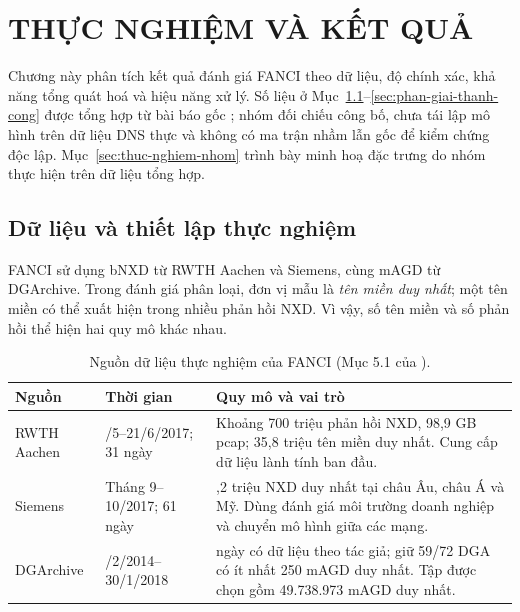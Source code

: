 \section{THỰC NGHIỆM VÀ KẾT QUẢ}\label{chap:thuc-nghiem}

Chương này phân tích kết quả đánh giá FANCI theo dữ liệu, độ chính xác, khả năng tổng quát hoá và hiệu năng xử lý. Số liệu ở Mục~\ref{sec:du-lieu}--\ref{sec:phan-giai-thanh-cong} được tổng hợp từ bài báo gốc \cite{schuppen2018fanci}; nhóm đối chiếu công bố, chưa tái lập mô hình trên dữ liệu DNS thực và không có ma trận nhầm lẫn gốc để kiểm chứng độc lập. Mục~\ref{sec:thuc-nghiem-nhom} trình bày minh hoạ đặc trưng do nhóm thực hiện trên dữ liệu tổng hợp.

\subsection{Dữ liệu và thiết lập thực nghiệm}\label{sec:du-lieu}\label{sec:thiet-lap}

FANCI sử dụng bNXD từ RWTH Aachen và Siemens, cùng mAGD từ DGArchive. Trong đánh giá phân loại, đơn vị mẫu là \emph{tên miền duy nhất}; một tên miền có thể xuất hiện trong nhiều phản hồi NXD. Vì vậy, số tên miền và số phản hồi thể hiện hai quy mô khác nhau.

\begin{table}[H]
\centering
\caption{Nguồn dữ liệu thực nghiệm của FANCI (Mục 5.1 của \cite{schuppen2018fanci}).}
\label{tab:c4-du-lieu}
\begin{tabularx}{\textwidth}{|>{\raggedright\arraybackslash}p{2.1cm}|>{\raggedright\arraybackslash}p{3.1cm}|>{\raggedright\arraybackslash}X|}
\hline
\rowcolor{LightCyan}
\textbf{Nguồn} & \textbf{Thời gian} & \textbf{Quy mô và vai trò} \\ \hline
RWTH Aachen & 22/5--21/6/2017; 31 ngày & Khoảng 700 triệu phản hồi NXD, 98,9 GB pcap; 35,8 triệu tên miền duy nhất. Cung cấp dữ liệu lành tính ban đầu. \\ \hline
Siemens & Tháng 9--10/2017; 61 ngày & 31,2 triệu NXD duy nhất tại châu Âu, châu Á và Mỹ. Dùng đánh giá môi trường doanh nghiệp và chuyển mô hình giữa các mạng. \\ \hline
DGArchive & 12/2/2014--30/1/2018 & 1.344 ngày có dữ liệu theo tác giả; giữ 59/72 DGA có ít nhất 250 mAGD duy nhất. Tập được chọn gồm 49.738.973 mAGD duy nhất. \\ \hline
\end{tabularx}
\end{table}

